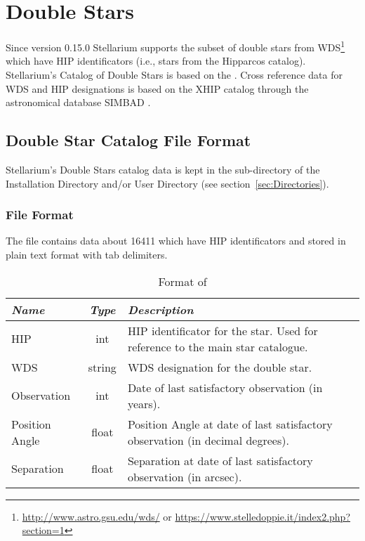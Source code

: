 \section{Double Stars}
\label{sec:StarCatalogues:DoubleStars}

Since version 0.15.0 Stellarium supports the subset of double stars
from WDS\footnote{\url{http://www.astro.gsu.edu/wds/} or \url{https://www.stelledoppie.it/index2.php?section=1}} which have HIP
identificators (i.e., stars from the Hipparcos catalog). Stellarium's Catalog
of Double Stars is based on the . %
Cross reference data for WDS and HIP designations is based on the 
XHIP catalog \citep{2012AstL...38..331A} through the astronomical 
database SIMBAD  \citep{2000A&AS..143....9W}.

\subsection{Double Star Catalog File Format}
\label{sec:StarCatalogues:DoubleStars:format}


Stellarium's Double Stars catalog data is kept
in the  sub-directory of the Installation Directory and/or
User Directory (see section~\ref{sec:Directories}).


\subsubsection{File Format}
\label{sec:StarCatalogues:DoubleStars:file}

The  file contains data about 16411
 which have HIP identificators and
stored in plain text format with tab delimiters.

\begin{table}[htb]
\begin{tabularx}{\textwidth}{l|c|X}\toprule
\emph{Name} & \emph{Type} & \emph{Description}\\\midrule
HIP      		& int    & HIP identificator for the star. Used for reference to the main star catalogue.\\%
WDS      		& string & WDS designation for the double star.\\%
Observation		& int	 & Date of last satisfactory observation (in years).\\%
Position Angle  & float  & Position Angle at date of last satisfactory observation (in decimal degrees).\\%
Separation 		& float  & Separation at date of last satisfactory observation (in arcsec).\\\bottomrule
\end{tabularx}
\caption{Format of }
\label{tab:StarCatalogues:DoubleStars:file}
\end{table}

